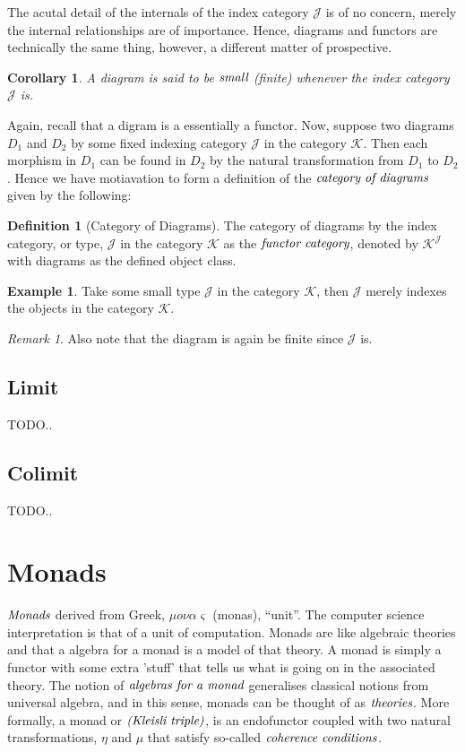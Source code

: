 \documentclass[10pt, oneside, reqno]{amsart}
\theoremstyle{plain}%
\newtheorem*{cor}{Corollary}
\theoremstyle{definition}
\newtheorem{defn}[thm]{Definition}
\newtheorem{exmp}[thm]{Example}
\theoremstyle{remark}
\newtheorem*{rem}{Remark}
\begin{document}
The acutal detail of the internals of the index category $\mathcal{J}$ is of no concern, merely the internal relationships
are of importance. Hence, diagrams and functors are technically the same thing, however, a different matter of prospective.

\begin{cor}
 A diagram is said to be $\emph{small}$ (finite) whenever the index category $\mathcal{J}$ is.
\end{cor}

Again, recall that a digram is a essentially a functor.
Now, suppose two diagrams $D_{1}$ and $D_{2}$ by some fixed indexing category $\mathcal{J}$ in the category $\mathcal{K}$.
Then each morphism in $D_{1}$ can be found in $D_{2}$ by the natural transformation from $D_{1}$ to $D_{2}$.
Hence we have motiavation to form a definition of the $\emph{category of diagrams}$ given by the following:

\begin{defn}[Category of Diagrams]
 The category of diagrams by the index category, or type, $\mathcal{J}$ in the category $\mathcal{K}$ as the $\emph{functor category}$,
 denoted by $\mathcal{K}^{\mathcal{J}}$ with diagrams as the defined object class.
\end{defn}

\begin{exmp}
 Take some small type $\mathcal{J}$ in the category $\mathcal{K}$,
 then $\mathcal{J}$ merely indexes the objects in the category $\mathcal{K}$.
 \begin{rem}
  Also note that the diagram is again be finite since $\mathcal{J}$ is.
 \end{rem}
\end{exmp}


\subsection{Limit} %
\label{subsec:limit}
TODO..

\subsection{Colimit} %
\label{subsec:colimit}
TODO..


\section{Monads} %
\label{sec:monads}
$\emph{Monads}$ derived from Greek, $\mu o \nu\alpha\varsigma$ (monas), ``unit''.
The computer science interpretation is that of a unit of computation.
Monads are like algebraic theories and that a algebra for a monad is a model of that theory. A monad is simply a functor
with some extra 'stuff' that tells us what is going on in the associated theory.
The notion of $\emph{algebras for a monad}$ generalises classical notions from universal algebra,
and in this sense, monads can be thought of as $\emph{theories}$.
More formally, a monad or $\emph{(Kleisli triple)}$, is an endofunctor coupled with two natural transformations,
$\eta$ and $\mu$ that satisfy so-called $\emph{coherence conditions}$.
\end{document}
